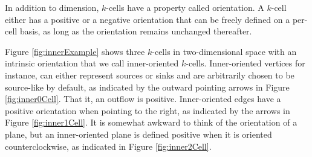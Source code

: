 In addition to dimension, $k$-cells have a property called orientation. A $k$-cell either has a positive or a negative orientation that can be freely defined on a per-cell basis, as long as the orientation remains unchanged thereafter. 

Figure \ref{fig:innerExample} shows three $k$-cells in two-dimensional space with an intrinsic orientation that we call inner-oriented $k$-cells. Inner-oriented vertices for instance, can either represent sources or sinks and are arbitrarily chosen to be source-like by default, as indicated by the outward pointing arrows in Figure \ref{fig:inner0Cell}. That it, an outflow is positive. Inner-oriented edges have a positive orientation when pointing to the right, as indicated by the arrows in Figure \ref{fig:inner1Cell}. It is somewhat awkward to think of the orientation of a plane, but an inner-oriented plane is defined positive when it is oriented counterclockwise, as indicated in Figure \ref{fig:inner2Cell}.

